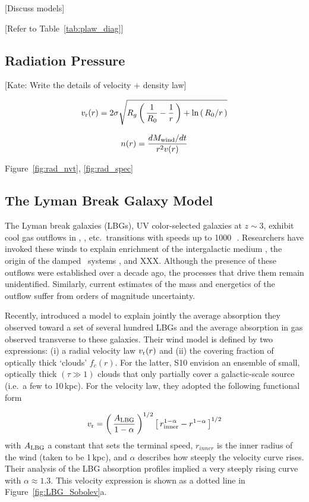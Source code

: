 \documentclass[12pt,preprint]{aastex}
\begin{document}
[Discuss models]

[Refer to Table~\ref{tab:plaw_diag}]

\subsection{Radiation Pressure}

[Kate: Write the details of velocity + density law]

\begin{equation}
v_{\rm r}(r) = 2\sigma \sqrt{R_g \left ( \, \frac{1}{R_0} - \frac{1}{r} \, \right )
   + \ln\left ( \, R_0/r \, \right ) }
\end{equation}

\begin{equation}
n(r) = \frac{dM_{\rm wind}/dt}{r^2 v(r)}
\end{equation}

Figure~\ref{fig:rad_nvt}, \ref{fig:rad_spec}

\subsection{The Lyman Break Galaxy Model}
\label{sec:lbg}

The Lyman break galaxies (LBGs), UV color-selected galaxies at $z \sim 3$,
exhibit cool gas outflows in , ,
etc.\ transitions with speeds up to 1000\,\kms\
\citep[e.g.][]{lkg+97,pks+98}.
Researchers have invoked these winds to explain enrichment of
the intergalactic medium \citep[e.g.][]{aguirre,spa+06}, the origin of the
damped \lya\ systems \citep{nbf98,schaye01a}, and XXX.  Although the
presence of these outflows were established over a decade ago,
the processes that drive them remain
unidentified.  Similarly,  current estimates of the mass and energetics of the
outflow suffer from orders of magnitude uncertainty.

Recently, \cite[][; hereafter S10]{steidel+10} introduced a model to
explain jointly the average absorption they observed
toward a set of several hundred LBGs and the average absorption in gas
observed transverse to these galaxies.  
Their wind model is defined by two
expressions: (i) a radial velocity law $v_{\rm r}(r)$ and (ii) the covering
fraction of optically thick `clouds' $f_c(r)$.  For the latter, S10
envision an 
ensemble of small, optically thick $(\tau \gg 1)$ clouds that only
partially cover a galactic-scale source (i.e.\ a few to 10\,kpc).
For the velocity law, they adopted the following functional
form

\begin{equation}
v_{\rm r} = \left ( \, \frac{A_{\rm LBG}}{1-\alpha} \, \right )^{1/2} \left [ \, r_{\rm
  inner}^{1-\alpha} - r^{1-\alpha} \, \right ]^{1/2}
\label{eqn:LBG_vlaw}
\end{equation}
with $A_{\rm LBG}$ a constant that sets the terminal speed,
$r_{inner}$ is the inner radius of the wind (taken to be 1\,kpc), and
$\alpha$ describes how steeply the velocity curve rises.  Their
analysis of the LBG absorption profiles implied
a very steeply rising curve with $\alpha \approx 1.3$.
This velocity expression is shown as a dotted line in 
Figure~\ref{fig:LBG_Sobolev}a.  
\end{document}
